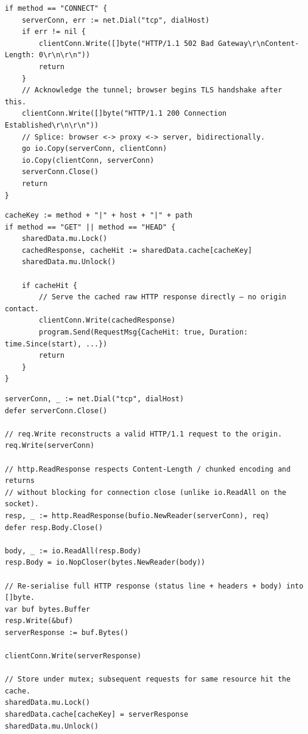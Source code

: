 \documentclass[11pt,a4paper]{article}
\begin{document}
\begin{lstlisting}[caption={HTTPS tunnel via CONNECT (proxy.go).}]
if method == "CONNECT" {
    serverConn, err := net.Dial("tcp", dialHost)
    if err != nil {
        clientConn.Write([]byte("HTTP/1.1 502 Bad Gateway\r\nContent-Length: 0\r\n\r\n"))
        return
    }
    // Acknowledge the tunnel; browser begins TLS handshake after this.
    clientConn.Write([]byte("HTTP/1.1 200 Connection Established\r\n\r\n"))
    // Splice: browser <-> proxy <-> server, bidirectionally.
    go io.Copy(serverConn, clientConn)
    io.Copy(clientConn, serverConn)
    serverConn.Close()
    return
}
\end{lstlisting}

\begin{lstlisting}[caption={Cache lookup and hit path (proxy.go).}]
cacheKey := method + "|" + host + "|" + path
if method == "GET" || method == "HEAD" {
    sharedData.mu.Lock()
    cachedResponse, cacheHit := sharedData.cache[cacheKey]
    sharedData.mu.Unlock()

    if cacheHit {
        // Serve the cached raw HTTP response directly — no origin contact.
        clientConn.Write(cachedResponse)
        program.Send(RequestMsg{CacheHit: true, Duration: time.Since(start), ...})
        return
    }
}
\end{lstlisting}

\begin{lstlisting}[caption={Fresh fetch and cache store (proxy.go).}]
serverConn, _ := net.Dial("tcp", dialHost)
defer serverConn.Close()

// req.Write reconstructs a valid HTTP/1.1 request to the origin.
req.Write(serverConn)

// http.ReadResponse respects Content-Length / chunked encoding and returns
// without blocking for connection close (unlike io.ReadAll on the socket).
resp, _ := http.ReadResponse(bufio.NewReader(serverConn), req)
defer resp.Body.Close()

body, _ := io.ReadAll(resp.Body)
resp.Body = io.NopCloser(bytes.NewReader(body))

// Re-serialise full HTTP response (status line + headers + body) into []byte.
var buf bytes.Buffer
resp.Write(&buf)
serverResponse := buf.Bytes()

clientConn.Write(serverResponse)

// Store under mutex; subsequent requests for same resource hit the cache.
sharedData.mu.Lock()
sharedData.cache[cacheKey] = serverResponse
sharedData.mu.Unlock()
\end{lstlisting}
\end{document}
